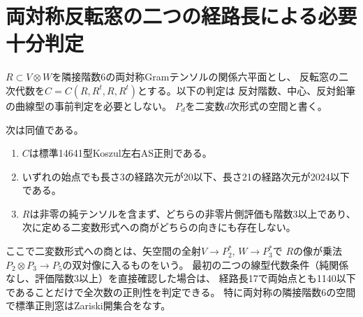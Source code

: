 \section{両対称反転窓の二つの経路長による必要十分判定}
\label{sec:bisymmetric-finite-path-test}
$R\subset V\otimes W$を隣接階数6の両対称Gramテンソルの関係六平面とし、
反転窓の二次代数を$C=C(R,R^t,R,R^t)$とする。以下の判定は
反対階数、中心、反対鉛筆の曲線型の事前判定を必要としない。
$P_d$を二変数$d$次形式の空間と書く。
\begin{theorem}\label{thm:bisymmetric-two-length-test}
次は同値である。
\begin{enumerate}
\item $C$は標準14641型Koszul左右AS正則である。
\item いずれの始点でも長さ3の経路次元が20以下、長さ21の経路次元が2024以下である。
\item $R$は非零の純テンソルを含まず、どちらの非零片側評価も階数3以上であり、
次に定める二変数形式への商がどちらの向きにも存在しない。
\end{enumerate}
ここで二変数形式への商とは、矢空間の全射$V\to P_2^*$, $W\to P_3^*$で
$R$の像が乗法$P_2\otimes P_3\to P_5$の双対像に入るものをいう。
最初の二つの線型代数条件（純関係なし、評価階数3以上）を直接確認した場合は、
経路長17で両始点とも1140以下であることだけで全次数の正則性を判定できる。
特に両対称の隣接階数6の空間で標準正則窓はZariski開集合をなす。
\end{theorem}
